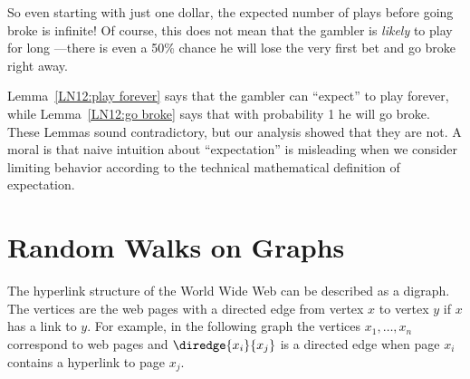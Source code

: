 So even starting with just one dollar, the expected number of plays
before going broke is infinite!  Of course, this does not mean that
the gambler is \emph{likely} to play for long ---there is even a 50\%
chance he will lose the very first bet and go broke right away.

\iffalse
In fact, if
the game is unfavorable, then Theorem~\ref{LN12:ExQthm} and
Corollary~\ref{LN12:biaswincor} imply that his expected time to go broke is
essentially proportional to his initial capital, \ie $\Theta(n)$.
\fi


\begin{editingnotes}
Lemma~\ref{LN12:play forever} says that the gambler can ``expect'' to play
forever, while Lemma~\ref{LN12:go broke} says that with probability 1 he will
go broke.  These Lemmas sound contradictory, but our analysis showed that
they are not.  A moral is that naive intuition about ``expectation'' is
misleading when we consider limiting behavior according to the technical
mathematical definition of expectation.
\end{editingnotes}



\begin{problems}
\classproblems
{}


\end{problems}


\section{Random Walks on Graphs}\label{Google_sec}

\begin{editingnotes}


\end{editingnotes}

The hyperlink structure of the World Wide Web can be described as a
digraph.  The vertices are the web pages with a directed edge from vertex
$x$ to vertex $y$ if $x$ has a link to $y$.  For example, in the following
graph the vertices $x_1, \ldots, x_n$ correspond to web pages and
$\diredge{x_i}{x_j}$ is a directed edge when page $x_i$ contains a
hyperlink to page $x_j$.

